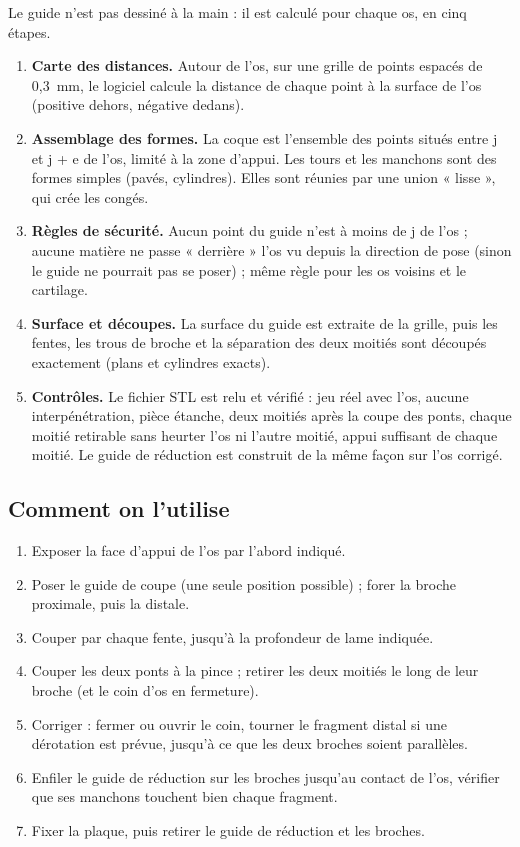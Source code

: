\documentclass[11pt,a4paper]{article}
\begin{document}
Le guide n'est pas dessiné à la main : il est calculé pour chaque os, en cinq étapes.
\begin{enumerate}
  \item \textbf{Carte des distances.} Autour de l'os, sur une grille de points espacés de 0,3~mm, le logiciel calcule
        la distance de chaque point à la surface de l'os (positive dehors, négative dedans).
  \item \textbf{Assemblage des formes.} La coque est l'ensemble des points situés entre j et j + e de l'os, limité à la
        zone d'appui. Les tours et les manchons sont des formes simples (pavés, cylindres). Elles sont réunies par une
        union « lisse », qui crée les congés.
  \item \textbf{Règles de sécurité.} Aucun point du guide n'est à moins de j de l'os ; aucune matière ne passe
        « derrière » l'os vu depuis la direction de pose (sinon le guide ne pourrait pas se poser) ; même règle pour les
        os voisins et le cartilage.
  \item \textbf{Surface et découpes.} La surface du guide est extraite de la grille, puis les fentes, les trous de
        broche et la séparation des deux moitiés sont découpés exactement (plans et cylindres exacts).
  \item \textbf{Contrôles.} Le fichier STL est relu et vérifié : jeu réel avec l'os, aucune interpénétration, pièce
        étanche, deux moitiés après la coupe des ponts, chaque moitié retirable sans heurter l'os ni l'autre moitié,
        appui suffisant de chaque moitié. Le guide de réduction est construit de la même façon sur l'os corrigé.
\end{enumerate}

\subsection{Comment on l'utilise}

\begin{enumerate}
  \item Exposer la face d'appui de l'os par l'abord indiqué.
  \item Poser le guide de coupe (une seule position possible) ; forer la broche proximale, puis la distale.
  \item Couper par chaque fente, jusqu'à la profondeur de lame indiquée.
  \item Couper les deux ponts à la pince ; retirer les deux moitiés le long de leur broche (et le coin d'os en
        fermeture).
  \item Corriger : fermer ou ouvrir le coin, tourner le fragment distal si une dérotation est prévue, jusqu'à ce que
        les deux broches soient parallèles.
  \item Enfiler le guide de réduction sur les broches jusqu'au contact de l'os, vérifier que ses manchons touchent
        bien chaque fragment.
  \item Fixer la plaque, puis retirer le guide de réduction et les broches.
\end{enumerate}
\end{document}
